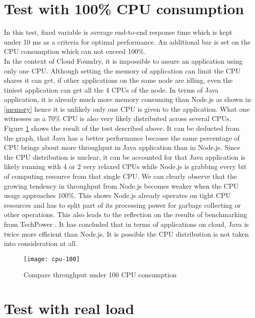 \section{Test with 100\% CPU consumption}
In this test, fixed variable is average end-to-end response time which is kept under 10 ms  as a criteria for optimal performance. An additional bar is set on the CPU consumption which can not exceed 100\%. \\
In the context of Cloud Foundry, it is impossible to assure an application using only one CPU. Although setting the memory of application can limit the CPU shares it can get, if other applications on the same node are idling, even the tiniest application can get all the 4 CPUs of the node. In terms of Java application, it is already much more memory consuming than Node.js as shown in \ref{memory} hence it is unlikely only one CPU is given to the application. What one witnesses as a 70\% CPU is also very likely distributed across several CPUs.\\
Figure \ref{cpu-100} shows the result of the test described above. It can be deducted from the graph, that Java has a better performance because the same percentage of CPU brings about more throughput in Java application than in Node.js. Since the CPU distribution is unclear, it can be accounted for that Java application is likely running with 4 or 2 very relaxed CPUs while Node.js is grabbing every bit of computing resource from that single CPU. We can clearly observe that the growing tendency in throughput from Node.js becomes weaker when the CPU usage approaches 100\%. This shows Node.js already operates on tight CPU resources and has to split part of its processing power for garbage collecting or other operations. This also leads to the reflection on the results of benchmarking from TechPower \citep{Benchmark}. It has concluded that in terms of applications on cloud, Java is twice more efficient than Node.js. It is possible the CPU distribution is not taken into consideration at all. 

\begin{figure}[h]
	\centering
	\texttt{[image: cpu-100]}
	\caption{Compare throughput under 100 CPU consumption}
	\label{cpu-100}
\end{figure}


\section{Test with real load}
